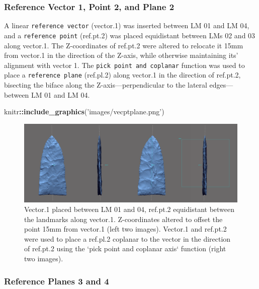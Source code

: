 \documentclass[
]{article}
\newenvironment{Shaded}{\begin{snugshade}}{\end{snugshade}}
\newcommand{\KeywordTok}[1]{\textcolor[rgb]{0.13,0.29,0.53}{\textbf{#1}}}
\newcommand{\NormalTok}[1]{#1}
\newcommand{\OperatorTok}[1]{\textcolor[rgb]{0.81,0.36,0.00}{\textbf{#1}}}
\newcommand{\StringTok}[1]{\textcolor[rgb]{0.31,0.60,0.02}{#1}}
\begin{document}
\hypertarget{reference-vector-1-point-2-and-plane-2}{%
\subsubsection{Reference Vector 1, Point 2, and Plane
2}\label{reference-vector-1-point-2-and-plane-2}}

A linear \texttt{reference\ vector} (vector.1) was inserted between LM
01 and LM 04, and a \texttt{reference\ point} (ref.pt.2) was placed
equidistant between LMs 02 and 03 along vector.1. The Z-coordinates of
ref.pt.2 were altered to relocate it 15mm from vector.1 in the direction
of the Z-axis, while otherwise maintaining its' alignment with vector 1.
The \texttt{pick\ point\ and\ coplanar} function was used to place a
\texttt{reference\ plane} (ref.pl.2) along vector.1 in the direction of
ref.pt.2, bisecting the biface along the Z-axis---perpendicular to the
lateral edges---between LM 01 and LM 04.

\begin{Shaded}
\begin{Highlighting}[]
\NormalTok{knitr}\OperatorTok{::}\KeywordTok{include_graphics}\NormalTok{(}\StringTok{'images/vecptplane.png'}\NormalTok{)}
\end{Highlighting}
\end{Shaded}

\begin{figure}
\includegraphics[width=1\linewidth]{images/vecptplane} \caption{Vector.1 placed between LM 01 and 04, ref.pt.2 equidistant between the landmarks along vector.1. Z-coordinates altered to offset the point 15mm from vector.1 (left two images). Vector.1 and ref.pt.2 were used to place a ref.pl.2 coplanar to the vector in the direction of ref.pt.2 using the `pick point and coplanar axis` function (right two images).}\label{fig:vecptplane}
\end{figure}

\hypertarget{reference-planes-3-and-4}{%
\subsubsection{Reference Planes 3 and
4}\label{reference-planes-3-and-4}}
\end{document}
